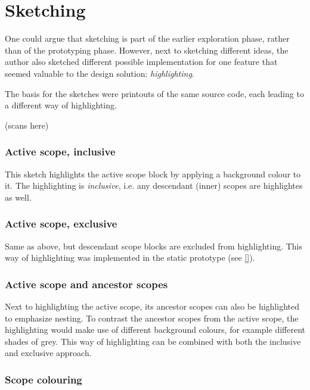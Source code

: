\section{Sketching}\label{sketching}

One could argue that sketching is part of the earlier exploration phase,
rather than of the prototyping phase. However, next to sketching
different ideas, the author also sketched different possible
implementation for one feature that seemed valuable to the design
solution: \emph{highlighting}.

The basis for the sketches were printouts of the same source code, each
leading to a different way of highlighting.

(scans here)

\subsubsection{Active scope, inclusive}\label{active-scope-inclusive}

This sketch highlights the active scope block by applying a background
colour to it. The highlighting is \emph{inclusive}, i.e. any descendant
(inner) scopes are highlightes as well.

\subsubsection{Active scope, exclusive}\label{active-scope-exclusive}

Same as above, but descendant scope blocks are excluded from
highlighting. This way of highlighting was implemented in the static
prototype (see \ref{}).

\subsubsection{Active scope and ancestor
scopes}\label{active-scope-and-ancestor-scopes}

Next to highlighting the active scope, its ancestor scopes can also be
highlighted to emphasize nesting. To contrast the ancestor scopes from
the active scope, the highlighting would make use of different
background colours, for example different shades of grey. This way of
highlighting can be combined with both the inclusive and exclusive
approach.

\subsubsection{Scope colouring}\label{scope-colouring}

